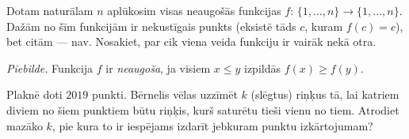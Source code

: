 \begin{problem}
Dotam naturālam $n$ aplūkosim visas neaugošās funkcijas ${f\colon\,\{1,\ldots,n\}\to\{1,\ldots,n\}}$.
Dažām no šīm funkcijām ir nekustīgais punkts (eksistē tāds $c$, kuram $f(c)=c$), bet citām --- nav. 
Nosakiet, par cik viena veida funkciju ir vairāk nekā otra.

\smallskip
\emph{Piebilde.} Funkcija \emph{$f$} ir \emph{neaugoša}, ja visiem $x \leq y$ izpildās $f(x)\geq f(y)$.
\end{problem}

\begin{problem}
Plaknē doti $2019$ punkti. Bērnelis vēlas uzzīmēt $k$ (slēgtus) riņķus tā, lai katriem diviem no šiem \mbox{punktiem} būtu riņķis, kurš saturētu tieši vienu no tiem.
Atrodiet mazāko $k$, pie kura to ir iespējams izdarīt jebkuram punktu izkārtojumam?
\end{problem}

%


